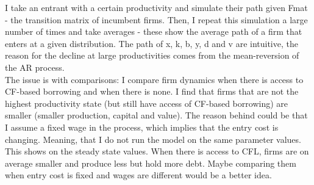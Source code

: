 \documentclass[12pt]{article}
\begin{document}
 I take an entrant with a certain productivity and simulate their path given Fmat - the transition matrix of incumbent firms. Then, I repeat this simulation a large number of times and take averages - these show the average path of a firm that enters at a given distribution. The path of x, k, b, y, d and v  are intuitive, the reason for the decline at large productivities comes from the mean-reversion of the AR process. \vspace{3mm} \\
The issue is with comparisons: I compare firm dynamics when there is access to CF-based borrowing and when there is none. I find that firms that are not the highest productivity state (but still have access of CF-based borrowing) are smaller (smaller production, capital and value). The reason behind could be that I assume a fixed wage in the process, which implies that the entry cost is changing. Meaning, that I do not run the model on the same parameter values. This shows on the steady state values.  When there is access to CFL, firms are on average smaller and produce less but hold more debt. Maybe comparing them when entry cost is fixed and wages are different would be a better idea. 

\newpage
\end{document}
